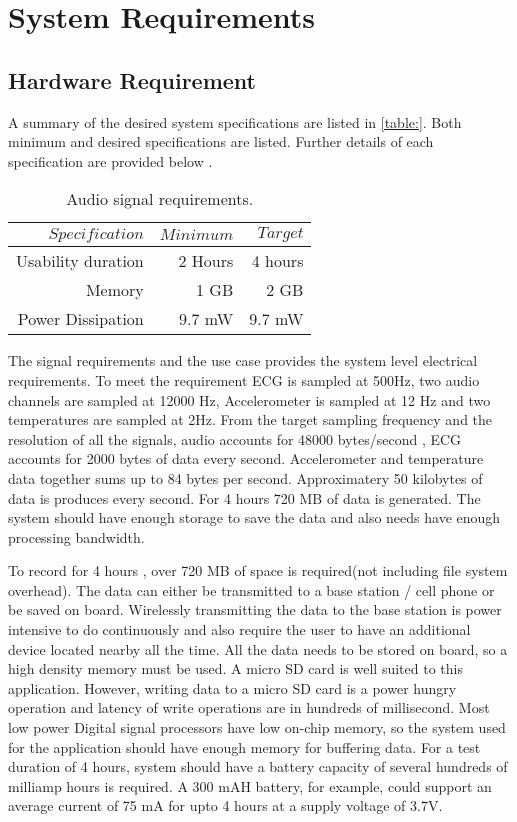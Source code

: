 \section{System Requirements}\label{system requirements}
\subsection{Hardware Requirement}

\hspace{10mm}A summary of the desired system specifications are listed in \ref{table:}. Both minimum and desired specifications are listed. Further details of each specification are provided below .
\begin{table}
	\centering
	\begin{tabular}{|r |r|r|}
		\hline
		$Specification$ & $Minimum$ & $Target$ \\
		\hline
		Usability duration  &  2 Hours & 4 hours \\
		Memory & 1 GB & 2 GB \\
		Power Dissipation & 9.7 mW & 9.7 mW \\
		\hline
	\end{tabular}
	\caption{Audio signal requirements.}
	\label{table:aud}
\end{table}

The signal requirements and the use case  provides the system level electrical requirements.  To meet the requirement ECG is sampled at 500Hz, two audio channels are sampled at 12000 Hz, Accelerometer is sampled at 12 Hz and two temperatures are sampled at 2Hz. From the target sampling frequency and the resolution of all the signals, audio accounts for 48000 bytes/second , ECG accounts for 2000 bytes of data every second. Accelerometer and temperature data together sums up to 84 bytes per second. Approximatery 50 kilobytes of data is produces every second. For 4 hours 720 MB of data is generated. The system should have enough storage to save the data and also needs have enough processing bandwidth. 

\hspace{10mm} To record for 4 hours , over 720 MB of space is required(not including file system overhead). The data can either be transmitted to a base station / cell phone or be saved on board. Wirelessly transmitting the data to the base station is power intensive to do continuously and also require the user to have an additional device located nearby all the time. 
All the data needs to be stored on board, so a high density memory must be used. A micro SD card is well suited to this application. However, writing data to a micro SD card is a power hungry operation and latency of write operations are in hundreds of millisecond. Most low power Digital signal processors have low on-chip memory, so the system used for the application should have enough memory for buffering data. For a test duration of 4 hours, system should have a battery capacity of several hundreds of milliamp hours is required. A 300 mAH battery, for example, could support an average current of 75 mA for upto 4 hours at a supply voltage of 3.7V. 

